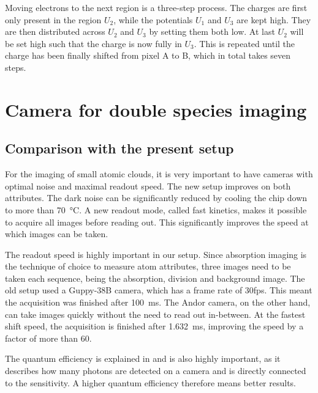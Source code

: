 	
	Moving electrons to the next region is a three-step process. The charges are first only present in the region $U_2$, while the potentials $U_1$ and $U_3$ are kept high. They are then distributed across $U_2$ and $U_3$ by setting them both low. At last $U_2$ will be set high such that the charge is now fully in $U_3$. This is repeated until the charge has been finally shifted from pixel A to B, which in total takes seven steps.

\section{Camera for double species imaging}
\label{ch:camera}

\subsection{Comparison with the present setup}
For the imaging of small atomic clouds, it is very important to have cameras with optimal noise and maximal readout speed. The new setup improves on both attributes. The dark noise can be significantly reduced by cooling the chip down to more than \SI{70}{\degreeCelsius}. A new readout mode, called fast kinetics, makes it possible to acquire all images before reading out. This significantly improves the speed at which images can be taken.

The readout speed is highly important in our setup. Since absorption imaging is the technique of choice to measure atom attributes, three images need to be taken each sequence, being the absorption, division and background image.
The old setup used a Guppy-38B \cite{Repp2013} camera, which has a frame rate of 30fps. This meant the acquisition was finished after \SI{100}{\milli\second}. The Andor camera, on the other hand, can take images quickly without the need to read out in-between. At the fastest shift speed, the acquisition is finished after \SI{1.632}{\milli\second}, improving the speed by a factor of more than $60$.

The quantum efficiency is explained in  and is also highly important, as it describes how many photons are detected on a camera and is directly connected to the sensitivity. A higher quantum efficiency therefore means better results. 

